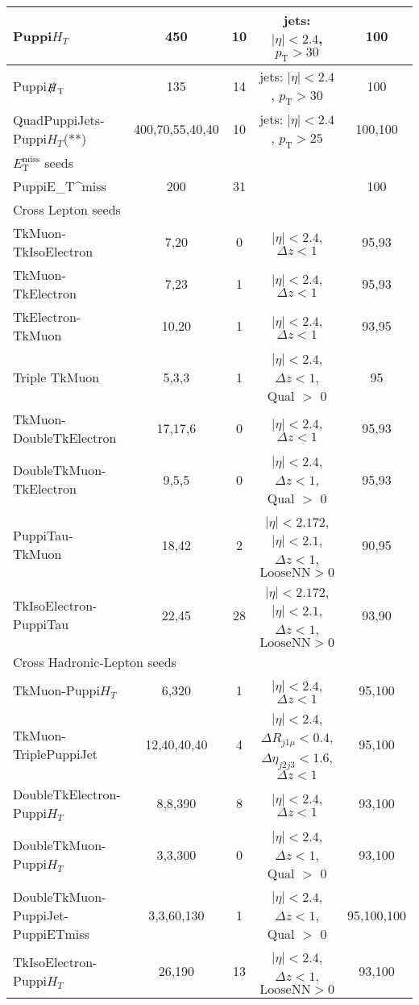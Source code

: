 \documentclass{article}
\newcommand{\pt}{\ensuremath{p_{\mathrm{T}}}\xspace}
\newcommand{\HT}{\ensuremath{H_{T}}\xspace}
\newcommand{\ETm}{\ensuremath{E_{\mathrm{T}}^{\text{miss}}}\xspace}
\newcommand{\ETmiss}{\ETm}
\begin{document}
\begin{table}[th]
\begin{adjustbox}{width=\textwidth}
{\begin{tabular}	{|l|c|c|c|c|}
\hline Puppi\HT & 450 & 10 & jets: $|\eta|<2.4$, $\pt >30$ & 100\\
\hline Puppi$\slashed{\ensuremath{H}}_{\mathrm{T}}$ & 135 & 14 & jets: $|\eta|<2.4$, $\pt >30$ & 100\\
\hline QuadPuppiJets-Puppi\HT(**) & 400,70,55,40,40 & 10 & jets: $|\eta|<2.4$, $\pt >25$ & 100,100\\
\hline
\hline \multicolumn{5}{|l|}{\ETmiss seeds} \\
\hline PuppiE_{T}^{miss} & 200 & 31 &  & 100\\
\hline
\hline \multicolumn{5}{|l|}{Cross Lepton seeds} \\
\hline TkMuon-TkIsoElectron & 7,20 & 0 & $|\eta|<2.4$, ${\Delta}z <1$ & 95,93\\
\hline TkMuon-TkElectron & 7,23 & 1 & $|\eta|<2.4$, ${\Delta}z <1$ & 95,93\\
\hline \color{black}TkElectron-TkMuon & 10,20 & 1 & $|\eta|<2.4$, ${\Delta}z <1$ & 93,95\\
\hline Triple TkMuon & 5,3,3 & 1 & $|\eta|<2.4$, ${\Delta}z <1$, Qual $>$ 0 & 95\\
\hline TkMuon-DoubleTkElectron & 17,17,6 & 0 & $|\eta|<2.4$, ${\Delta}z <1$ & 95,93\\
\hline DoubleTkMuon-TkElectron & 9,5,5 & 0 & $|\eta|<2.4$, ${\Delta}z <1$, Qual $>$ 0 & 95,93\\
\hline PuppiTau-TkMuon & 18,42 & 2 &  $|\eta|<2.172$, $|\eta|<2.1$, ${\Delta}z <1$, $\text{LooseNN} > 0$ & 90,95\\
\hline TkIsoElectron-PuppiTau & 22,45 & 28 & $|\eta|<2.172$, $|\eta|<2.1$, ${\Delta}z <1$, $\text{LooseNN} > 0$ & 93,90\\
\hline
\hline \multicolumn{5}{|l|}{Cross Hadronic-Lepton seeds} \\
\hline TkMuon-Puppi\HT & 6,320 & 1 & $|\eta|<2.4$, ${\Delta}z <1$ & 95,100\\
\hline TkMuon-TriplePuppiJet & 12,40,40,40 & 4 & $|\eta|<2.4$, ${\Delta}R_{j1\mu}<0.4$,${\Delta}\eta_{j2j3}<1.6$, ${\Delta}z <1$ & 95,100\\
\hline DoubleTkElectron-Puppi\HT & 8,8,390 & 8 & $|\eta|<2.4$, ${\Delta}z <1$ & 93,100\\
\hline DoubleTkMuon-Puppi\HT & 3,3,300 & 0 & $|\eta|<2.4$, ${\Delta}z <1$, Qual $>$ 0 & 93,100\\
\hline DoubleTkMuon-PuppiJet-PuppiETmiss & 3,3,60,130 & 1 & $|\eta|<2.4$, ${\Delta}z <1$, Qual $>$ 0 & 95,100,100\\
\hline TkIsoElectron-Puppi\HT & 26,190 & 13 & $|\eta|<2.4$, ${\Delta}z <1$, $\text{LooseNN} > 0$ & 93,100\\

\end{tabular}}
\end{adjustbox}
\end{table}
\end{document}
